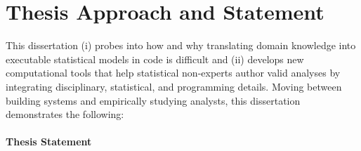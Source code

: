 



\begin{comment}
One naive approach....
The naive approach would be to provide analysts with software that automatically tells them which analyses to use.

But that approach is not enough. Therefore, we should look at fundamentally
changing how we write code -- evolution vs. revolution? 
\end{comment}

\section{Thesis Approach and Statement}


This dissertation (i) probes into how and why translating domain knowledge into
executable statistical models in code is difficult and (ii) develops new
computational tools that help statistical non-experts author valid analyses by
integrating disciplinary, statistical, and programming details. Moving between
building systems and empirically studying analysts, this dissertation
demonstrates the following:%
\paragraph{Thesis Statement} \label{para:thesisStatement}

